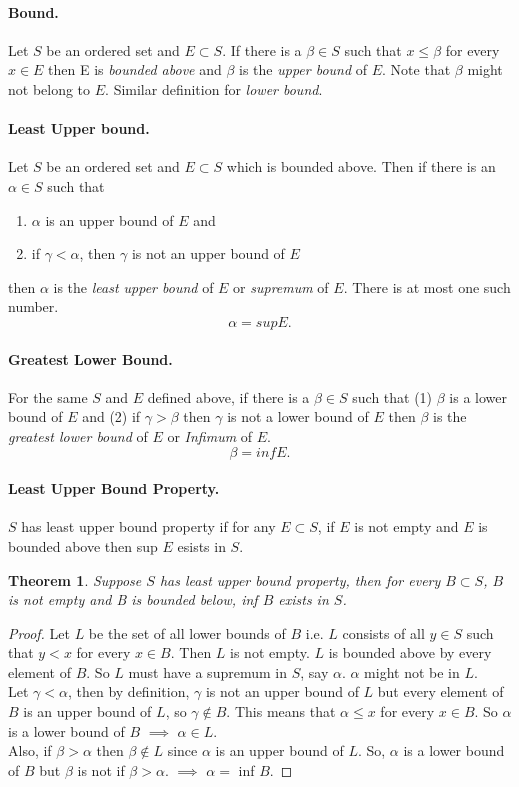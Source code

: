 \documentclass{article}
\newtheorem{theorem}{Theorem}
\begin{document}
	\paragraph{Bound.} Let $S$ be an ordered set and $E \subset S$. If there is a $\beta \in S$ such that $x \leq \beta$ for every $x \in E$ then 
	E is \emph{bounded above} and $\beta$ is the \emph{upper bound} of $E$. Note that $\beta$ might not belong to $E$. Similar definition for 
	\emph{lower bound}.
	\paragraph{Least Upper bound. } Let $S$ be an ordered set and $E \subset S$ which is bounded above. Then if there is an $\alpha \in S$ such that
	\begin{enumerate}
		\item $\alpha$ is an upper bound of $E$ and 
		\item if $\gamma < \alpha$, then $\gamma$ is not an upper bound of $E$ 
	\end{enumerate}
	then $\alpha$ is the \emph{least upper bound} of $E$ or \emph{supremum} of $E$. There is at most one such number. \[\alpha = sup E.\]
	\paragraph{Greatest Lower Bound. } For the same $S$ and $E$ defined above, if there is a $\beta \in S$ such that (1) $\beta$ is a lower 
	bound of $E$ and (2) if $\gamma > \beta$ then $\gamma$ is not a lower bound of $E$ then $\beta$ is the \emph{greatest lower bound} of 
	$E$ or \emph{Infimum} of $E$. \[\beta = inf E.\]
	 \paragraph{Least Upper Bound Property.} $S$ has least upper bound property if for any $E \subset S$, if $E$ is not empty and $E$ is 
	 bounded above then sup $E$ esists in $S$.
	 \begin{theorem}
	 	Suppose $S$ has least upper bound property, then for every $B \subset S$, $B$ is not empty and B is bounded below, inf $B$ exists
	 	in $S$.
	 \end{theorem}
	 \begin{proof}
	 	Let $L$ be the set of all lower bounds of $B$ i.e. $L$ consists of all $y \in S$ such that $y < x$ for every $x \in B$. Then $L$ is not empty.
	 	$L$ is bounded above by every element of $B$. So $L$ must have a supremum in $S$, say $\alpha$. $\alpha$ might not be in $L$. \\
	 	Let $\gamma < \alpha$, then by definition, $\gamma$ is not an upper bound of $L$ but every element of $B$ is an upper bound of $L$, so
	 	$\gamma \notin B$. This means that $\alpha \leq x$ for every $x \in B$. So $\alpha$ is a lower bound of $B$ $\implies$ $\alpha \in L$.\\
	 	Also, if $\beta > \alpha$ then $\beta \notin L$ since $\alpha$ is an upper bound of $L$. So, $\alpha$ is a lower bound of $B$ but $\beta$ is 
	 	not if $\beta > \alpha$. $\implies$ $\alpha = $ inf $B$.  
	 \end{proof}
 
\end{document}
